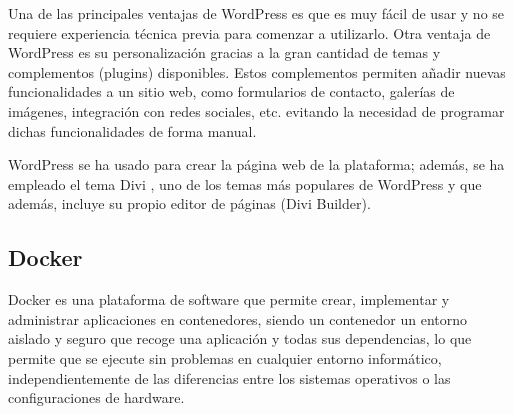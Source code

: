             Una de las principales ventajas de WordPress es que es muy fácil de usar y no se requiere experiencia técnica previa para comenzar a utilizarlo. Otra ventaja de WordPress es su personalización gracias a la gran cantidad de temas y complementos (plugins) disponibles. Estos complementos permiten añadir nuevas funcionalidades a un sitio web, como formularios de contacto, galerías de imágenes, integración con redes sociales, etc. evitando la necesidad de programar dichas funcionalidades de forma manual.
            
            WordPress se ha usado para crear la página web de la plataforma; además, se ha empleado el tema Divi \cite{divi}, uno de los temas más populares de WordPress y que además, incluye su propio editor de páginas (Divi Builder).
            
            \newpage

            
        \subsection{Docker}
            \label{sec:docker}
        
            Docker es una plataforma de software que permite crear, implementar y administrar aplicaciones en contenedores, siendo un contenedor un entorno aislado y seguro que recoge una aplicación y todas sus dependencias, lo que permite que se ejecute sin problemas en cualquier entorno informático, independientemente de las diferencias entre los sistemas operativos o las configuraciones de hardware.
            
